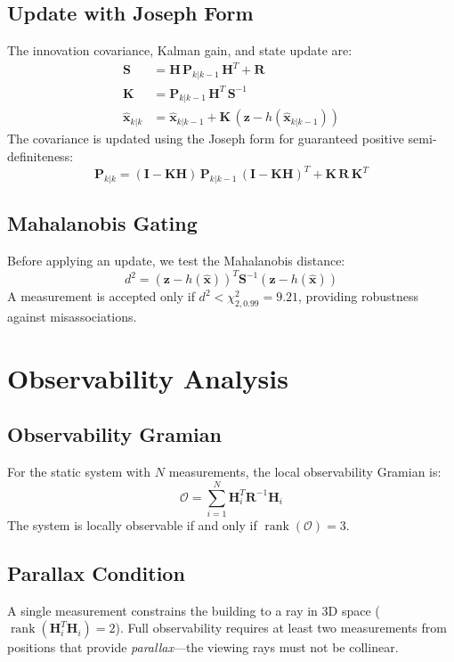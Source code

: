 \documentclass[journal]{IEEEtran}
\newcommand{\vx}{\mathbf{x}}
\newcommand{\vz}{\mathbf{z}}
\newcommand{\vP}{\mathbf{P}}
\newcommand{\vR}{\mathbf{R}}
\newcommand{\vH}{\mathbf{H}}
\newcommand{\vK}{\mathbf{K}}
\newcommand{\vI}{\mathbf{I}}
\newcommand{\vS}{\mathbf{S}}
\begin{document}
\subsection{Update with Joseph Form}
The innovation covariance, Kalman gain, and state update are:
\begin{align}
    \vS &= \vH\,\vP_{k|k-1}\,\vH^T + \vR \\
    \vK &= \vP_{k|k-1}\,\vH^T\,\vS^{-1} \\
    \hat{\vx}_{k|k} &= \hat{\vx}_{k|k-1} + \vK\,(\vz - h(\hat{\vx}_{k|k-1}))
\end{align}
The covariance is updated using the Joseph form for guaranteed positive semi-definiteness:
\begin{equation}\label{eq:joseph}
    \vP_{k|k} = (\vI - \vK\vH)\,\vP_{k|k-1}\,(\vI - \vK\vH)^T + \vK\,\vR\,\vK^T
\end{equation}

\subsection{Mahalanobis Gating}
Before applying an update, we test the Mahalanobis distance:
\begin{equation}
    d^2 = (\vz - h(\hat{\vx}))^T \vS^{-1} (\vz - h(\hat{\vx}))
\end{equation}
A measurement is accepted only if $d^2 < \chi^2_{2,0.99} = 9.21$, providing robustness against misassociations.

\section{Observability Analysis}

\subsection{Observability Gramian}
For the static system with $N$ measurements, the local observability Gramian is:
\begin{equation}\label{eq:gramian}
    \mathcal{O} = \sum_{i=1}^{N} \vH_i^T \vR^{-1} \vH_i
\end{equation}
The system is locally observable if and only if $\operatorname{rank}(\mathcal{O}) = 3$.

\subsection{Parallax Condition}
A single measurement constrains the building to a ray in 3D space ($\operatorname{rank}(\vH_i^T\vH_i) = 2$).
Full observability requires at least two measurements from positions that provide \emph{parallax}---the viewing rays must not be collinear.
\end{document}
